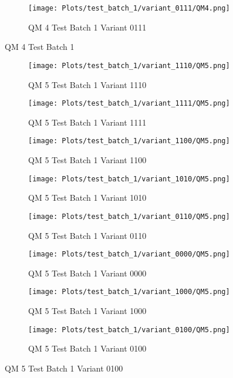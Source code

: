 \documentclass{DissertateFigs}
\begin{document}
\begin{figure}[t!]
\medskip

    \begin{subfigure}{0.47\textwidth}
    \texttt{[image: Plots/test\_batch\_1/variant\_0111/QM4.png]}
    \caption{QM 4 Test Batch 1 Variant 0111}
    \end{subfigure}
\caption{QM 4 Test Batch 1}
    \end{figure}
\clearpage
\begin{figure}[t!]
    \begin{subfigure}{0.47\textwidth}
    \texttt{[image: Plots/test\_batch\_1/variant\_1110/QM5.png]}
    \caption{QM 5 Test Batch 1 Variant 1110}
    \end{subfigure}
    \begin{subfigure}{0.47\textwidth}
    \texttt{[image: Plots/test\_batch\_1/variant\_1111/QM5.png]}
    \caption{QM 5 Test Batch 1 Variant 1111}
    \end{subfigure}

\medskip

    \begin{subfigure}{0.47\textwidth}
    \texttt{[image: Plots/test\_batch\_1/variant\_1100/QM5.png]}
    \caption{QM 5 Test Batch 1 Variant 1100}
    \end{subfigure}
    \begin{subfigure}{0.47\textwidth}
    \texttt{[image: Plots/test\_batch\_1/variant\_1010/QM5.png]}
    \caption{QM 5 Test Batch 1 Variant 1010}
    \end{subfigure}

\medskip

    \begin{subfigure}{0.47\textwidth}
    \texttt{[image: Plots/test\_batch\_1/variant\_0110/QM5.png]}
    \caption{QM 5 Test Batch 1 Variant 0110}
    \end{subfigure}
    \begin{subfigure}{0.47\textwidth}
    \texttt{[image: Plots/test\_batch\_1/variant\_0000/QM5.png]}
    \caption{QM 5 Test Batch 1 Variant 0000}
    \end{subfigure}

\medskip

    \begin{subfigure}{0.47\textwidth}
    \texttt{[image: Plots/test\_batch\_1/variant\_1000/QM5.png]}
    \caption{QM 5 Test Batch 1 Variant 1000}
    \end{subfigure}
    \begin{subfigure}{0.47\textwidth}
    \texttt{[image: Plots/test\_batch\_1/variant\_0100/QM5.png]}
    \caption{QM 5 Test Batch 1 Variant 0100}
    \end{subfigure}


\end{figure}
\end{document}
